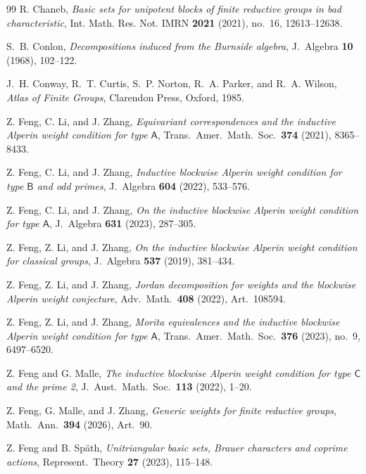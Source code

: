 \documentclass[10pt]{amsart}
\theoremstyle{definition}
\numberwithin{equation}{section}
\numberwithin{table}{section}
\begin{document}
\begin{thebibliography}{99}
R. Chaneb,
{\it Basic sets for unipotent blocks of finite reductive groups in bad
characteristic},
Int. Math. Res. Not. IMRN \textbf{2021} (2021), no.~16, 12613--12638.

S.~B. Conlon,
{\it Decompositions induced from the Burnside algebra},
J.\ Algebra \textbf{10} (1968), 102--122.

J.~H. Conway, R.~T. Curtis, S.~P. Norton, R.~A. Parker, and R.~A. Wilson,
{\it Atlas of Finite Groups},
Clarendon Press, Oxford, 1985.

Z. Feng, C. Li, and J. Zhang,
{\it Equivariant correspondences and the inductive Alperin weight condition
for type $\mathsf A$},
Trans.\ Amer.\ Math.\ Soc.\ \textbf{374} (2021), 8365--8433.

Z. Feng, C. Li, and J. Zhang,
{\it Inductive blockwise Alperin weight condition for type $\mathsf B$ and odd
primes},
J.\ Algebra \textbf{604} (2022), 533--576.

Z. Feng, C. Li, and J. Zhang,
{\it On the inductive blockwise Alperin weight condition for type $\mathsf A$},
J.\ Algebra \textbf{631} (2023), 287--305.

Z. Feng, Z. Li, and J. Zhang,
{\it On the inductive blockwise Alperin weight condition for classical
groups},
J.\ Algebra \textbf{537} (2019), 381--434.

Z. Feng, Z. Li, and J. Zhang,
{\it Jordan decomposition for weights and the blockwise Alperin weight
conjecture},
Adv.\ Math.\ \textbf{408} (2022), Art.~108594.

Z. Feng, Z. Li, and J. Zhang,
{\it Morita equivalences and the inductive blockwise Alperin weight
condition for type $\mathsf A$},
Trans.\ Amer.\ Math.\ Soc.\ \textbf{376} (2023), no.~9, 6497--6520.

Z. Feng and G. Malle,
{\it The inductive blockwise Alperin weight condition for type $\mathsf C$ and the
prime 2},
J.\ Aust.\ Math.\ Soc.\ \textbf{113} (2022), 1--20.

Z. Feng, G. Malle, and J. Zhang,
{\it Generic weights for finite reductive groups},
Math.\ Ann.\ \textbf{394} (2026), Art.~90.

Z. Feng and B. Sp\"ath,
{\it Unitriangular basic sets, Brauer characters and coprime actions},
Represent.\ Theory \textbf{27} (2023), 115--148.


\end{thebibliography}
\end{document}
